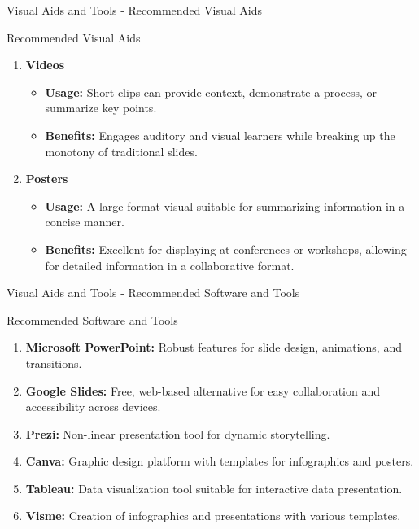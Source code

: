 \documentclass[aspectratio=169]{beamer}
\begin{document}
\begin{frame}[fragile]{Visual Aids and Tools - Recommended Visual Aids}
\begin{block}{Recommended Visual Aids}
\begin{enumerate}
\begin{itemize}
                \end{itemize}
            \item \textbf{Videos}
                \begin{itemize}
                    \item \textbf{Usage:} Short clips can provide context, demonstrate a process, or summarize key points.
                    \item \textbf{Benefits:} Engages auditory and visual learners while breaking up the monotony of traditional slides.
                \end{itemize}
            \item \textbf{Posters}
                \begin{itemize}
                    \item \textbf{Usage:} A large format visual suitable for summarizing information in a concise manner.
                    \item \textbf{Benefits:} Excellent for displaying at conferences or workshops, allowing for detailed information in a collaborative format.
                \end{itemize}
        \end{enumerate}
    \end{block}
\end{frame}

\begin{frame}[fragile]{Visual Aids and Tools - Recommended Software and Tools}
    \begin{block}{Recommended Software and Tools}
        \begin{enumerate}
            \item \textbf{Microsoft PowerPoint:} Robust features for slide design, animations, and transitions.
            \item \textbf{Google Slides:} Free, web-based alternative for easy collaboration and accessibility across devices.
            \item \textbf{Prezi:} Non-linear presentation tool for dynamic storytelling.
            \item \textbf{Canva:} Graphic design platform with templates for infographics and posters.
            \item \textbf{Tableau:} Data visualization tool suitable for interactive data presentation.
            \item \textbf{Visme:} Creation of infographics and presentations with various templates.
        \end{enumerate}
    \end{block}
\end{frame}
\end{document}
